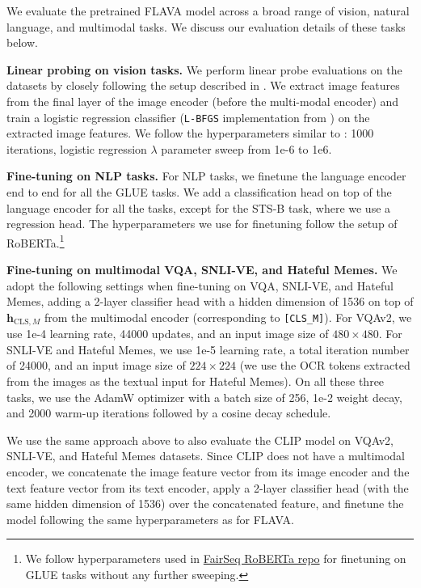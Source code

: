 \documentclass[10pt,twocolumn,letterpaper]{article}
\newcommand{\myparagraph}[1]{\vspace{0.25em}\noindent\textbf{#1}}
\begin{document}
We evaluate the pretrained FLAVA model across a broad range of vision, natural language, and multimodal tasks. We discuss our evaluation details of these tasks below.

\myparagraph{Linear probing on vision tasks.} We perform linear probe evaluations on the datasets by closely following the setup described in \cite{radford2021learning}. We extract image features from the final layer of the image encoder (before the multi-modal encoder) and train a logistic regression classifier (\texttt{L-BFGS} implementation from \cite{scikit-learn}) on the extracted image features. We follow the hyperparameters similar to \cite{radford2021learning} : 1000 iterations, logistic regression $\lambda$ parameter sweep from 1e-6 to 1e6.

\myparagraph{Fine-tuning on NLP tasks.} For NLP tasks, we finetune the language encoder end to end for all the GLUE tasks. We add a classification head on top of the language encoder for all the tasks, except for the STS-B task, where we use a regression head. The hyperparameters we use for finetuning follow the setup of RoBERTa\cite{liu2019roberta}.\footnote{We follow hyperparameters used in \href{https://github.com/pytorch/fairseq/tree/main/examples/roberta}{FairSeq RoBERTa repo} for finetuning on GLUE tasks without any further sweeping.}

\myparagraph{Fine-tuning on multimodal VQA, SNLI-VE, and Hateful Memes.} We adopt the following settings when fine-tuning on VQA, SNLI-VE, and Hateful Memes, adding a 2-layer classifier head with a hidden dimension of 1536 on top of $\mathbf{h}_{\mathrm{CLS},M}$ from the multimodal encoder (corresponding to \texttt{[CLS\_M]}). For VQAv2, we use 1e-4 learning rate, 44000 updates, and an input image size of $480\times 480$. For SNLI-VE and Hateful Memes, we use 1e-5 learning rate, a total iteration number of 24000, and an input image size of $224\times 224$ (we use the OCR tokens extracted from the images as the textual input for Hateful Memes). On all these three tasks, we use the AdamW optimizer with a batch size of 256, 1e-2 weight decay, and 2000 warm-up iterations followed by a cosine decay schedule.

We use the same approach above to also evaluate the CLIP model on VQAv2, SNLI-VE, and Hateful Memes datasets. Since CLIP does not have a multimodal encoder, we concatenate the image feature vector from its image encoder and the text feature vector from its text encoder, apply a 2-layer classifier head (with the same hidden dimension of 1536) over the concatenated feature, and finetune the model following the same hyperparameters as for FLAVA.
\end{document}
